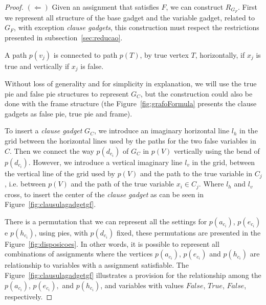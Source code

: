 \documentclass[a4paper,11pt]{article}
\begin{document}
\begin{proof}
$(\Leftarrow)$ Given an assignment that satisfies $F$, we can construct $R_{G_F}$. First we represent all structure of the base gadget and the variable gadget, related to  $G_{F}$, with exception  \textit{clause gadgets},
this construction must respect the restrictions presented in subsection~\ref{sec:reducao}. 

A path $p(v_{j})$ is connected to path $p(T)$, by true vertex $T$, horizontally, if $x_{j}$ is true and vertically if $x_{j}$ is false. 

Without loss of generality and for simplicity in explanation, we will use the true pie and false pie structures to represent $ G_C$, but the construction could also be done with the frame structure (the Figure~\ref{fig:grafoFormula} presents the clause gadgets as false pie, true pie and frame). 

To insert a \textit{ clause gadget} $G_{C}$, we introduce an imaginary horizontal line $l_{h}$ in the grid between the horizontal lines used by the paths for the two false variables in $ C $. Then we connect the way $p(d_{c_i})$ of $G_{C}$ in $p(V)$ vertically using the bend of $p(d_{c_i})$. However, we introduce a vertical imaginary line $ l_{v}$ in the grid, between the vertical line of the grid used by $p(V)$ and the path to the true variable in $C_j$, i.e. between $p(V)$ and the path of the true variable $x_i \in C_j$. Where $l_{h}$ and $l_{v}$ cross, to insert the center of the  \textit{clause gadget} as can be seen in Figure~\ref{fig:clausulagadgetgf}. 

There is a permutation that we can represent all the settings for  $p(a_{c_i})$, $p(e_{c_i})$ e $p(h_{c_i})$, using pies, with $p(d_{c_i})$ fixed, these permutations are presented in the Figure~\ref{fig:disposicoes}. In other words,  it is possible to represent all combinations of assignments where the vertices $p(a_{c_i})$, $p(e_{c_i})$ and $p(h_{c_i})$ are relationship to variables with a assignment satisfiable. %
The Figure~\ref{fig:clausulagadgetgf} illustrates a provision for the relationship among the  $p(a_{c_i})$, $p(e_{c_i}), $ and $p(h_{c_i}) $, and variables with values $False$,  $True$, $False$, respectively.  







\end{proof}
\end{document}
